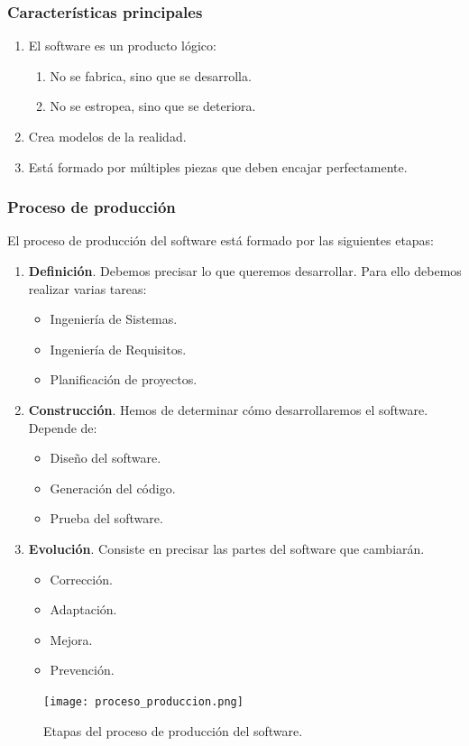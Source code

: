 \documentclass[12pt,spanish]{article}
\begin{document}
\subsubsection{Características principales}

\begin{enumerate}
	\item El software es un producto lógico:
		\begin{enumerate}
			\item No se fabrica, sino que se desarrolla.
			\item No se estropea, sino que se deteriora.
		\end{enumerate}
	\item Crea modelos de la realidad.
	\item Está formado por múltiples piezas que deben encajar perfectamente.
\end{enumerate}

\subsubsection{Proceso de producción}

El proceso de producción del software está formado por las siguientes etapas:
\begin{enumerate}
	\item \textbf{Definición}. Debemos precisar lo que queremos desarrollar. Para ello debemos realizar varias tareas:
		\begin{itemize}
			\item Ingeniería de Sistemas.
			\item Ingeniería de Requisitos.
			\item Planificación de proyectos.
		\end{itemize}
	\item \textbf{Construcción}. Hemos de determinar cómo desarrollaremos el software. Depende de:
		\begin{itemize}
			\item Diseño del software.
			\item Generación del código.
			\item Prueba del software.
		\end{itemize}
	\item \textbf{Evolución}. Consiste en precisar las partes del software que cambiarán.
		\begin{itemize}
			\item Corrección.
			\item Adaptación.
			\item Mejora.
			\item Prevención.
		\end{itemize}
\end{enumerate}
\begin{figure}[H]
\centering
\texttt{[image: proceso\_produccion.png]}
\caption{Etapas del proceso de producción del software.}
\end{figure}
\end{document}
